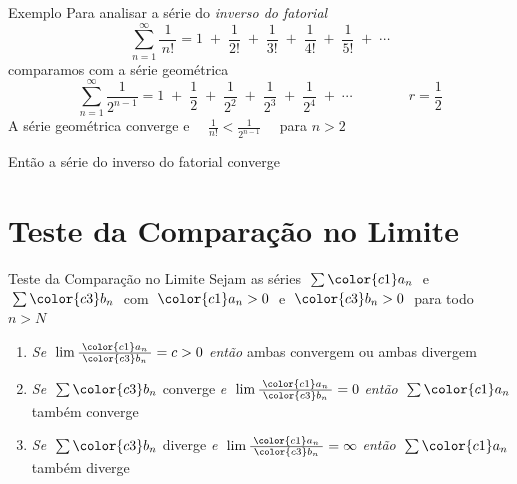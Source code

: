 \addtocounter{exemplo}{1}
\begin{frame}{Exemplo \theexemplo}
  Para analisar a série do \emph{inverso do fatorial}
  \[
    \sum_{n=1}^{\infty} \frac{1}{\,n!\,}
    = 1             \;+\;
      \frac{1}{2!}  \;+\;
      \frac{1}{3!}  \;+\;
      \frac{1}{4!}  \;+\;
      \frac{1}{5!}  \;+\;
      \cdots
  \]
  \pause
  comparamos com a série geométrica
  \[ \sum_{n=1}^{\infty} \frac{1}{2^{n-1}}
    = 1              \;+\;
      \frac{1}{2}    \;+\;
      \frac{1}{2^2}  \;+\;
      \frac{1}{2^3}  \;+\;
      \frac{1}{2^4}  \;+\;
      \cdots
      \qquad
      \qquad
      r=\frac{1}{2}
  \]
  \pause
  A série geométrica converge
  \pause
  e
  \(\quad \frac{1}{n!} < \frac{1}{2^{n-1}}\quad\)
  para $n>2$

  \pause
  \vspace{\baselineskip}
  Então a série do inverso do fatorial converge
\end{frame}

\section{Teste da Comparação no Limite}

\begin{frame}{Teste da Comparação no Limite}
  Sejam as séries
  \(\; \sum {\color{c1} a_n} \;\) e
  \(\; \sum {\color{c3} b_n} \;\)
  com $\;{\color{c1} a_n} > 0\;$ e $\;{\color{c3} b_n}>0\;$ para todo $n>N$
  \pause
  \vspace{\baselineskip}
  \begin{enumerate}
    \item
    \emph{Se} \(\;\lim \frac{\;{\color{c1} a_n}\;}{{\color{c3} b_n}} = c > 0 \) \;\;
    \emph{então}\; ambas convergem ou ambas divergem

    \pause
    \vfill
    \item
    \emph{Se} \(\;\sum {\color{c3} b_n}\) converge
    \tabto{36mm} \emph{e} \(\;\lim \frac{\;{\color{c1} a_n}\;}{{\color{c3} b_n}} = 0\)
    \tabto{66mm} \emph{então} \(\;\sum {\color{c1} a_n} \) também converge

    \pause
    \vfill
    \item
    \emph{Se} \(\;\sum {\color{c3} b_n}\) diverge
    \tabto{36mm} \emph{e} \(\;\lim \frac{\;{\color{c1} a_n}\;}{{\color{c3} b_n}} = \infty\)
    \tabto{66mm} \emph{então} \(\;\sum {\color{c1} a_n} \) também diverge

    \vfill
  \end{enumerate}
\end{frame}

